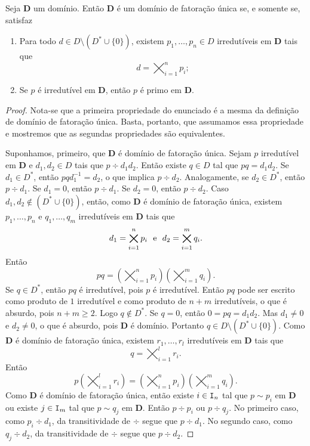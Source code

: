 \begin{teo}
	Seja $\bm D$ um domínio. Então $\bm D$ é um domínio de fatoração única se, e somente se, satisfaz
	\begin{enumerate}
	\item Para todo $d \in D \setminus (D^* \cup \{0\})$, existem $p_1, \ldots, p_n \in D$ irredutíveis em $\bm D$ tais que
	\begin{equation*}
	d = \bigtimes_{i=1}^n p_i;
	\end{equation*}
	\item Se $p$ é irredutível em $\bm D$, então $p$ é primo em $\bm D$.
	\end{enumerate}
\end{teo}
\begin{proof}
	Nota-se que a primeira propriedade do enunciado é a mesma da definição de domínio de fatoração única. Basta, portanto, que assumamos essa propriedade e mostremos que as segundas propriedades são equivalentes.

	Suponhamos, primeiro, que $\bm D$ é domínio de fatoração única. Sejam $p$ irredutível em $\bm D$ e $d_1,d_2 \in D$ tais que $p \div d_1d_2$. Então existe $q \in D$ tal que $pq=d_1d_2$. Se $d_1 \in D^*$, então $pqd_1^{-1}=d_2$, o que implica $p \div d_2$. Analogamente, se $d_2 \in D^*$, então $p \div d_1$. Se $d_1 = 0$, então $p \div d_1$. Se $d_2 = 0$, então $p \div d_2$. Caso $d_1,d_2 \notin (D^* \cup \{0\})$, então, como $\bm D$ é domínio de fatoração única, existem $p_1,\ldots,p_n$ e $q_1,\ldots,q_m$ irredutíveis em $\bm D$ tais que
	\begin{equation*}
	d_1 = \bigtimes_{i=1}^n p_i \text{\ \ e\ \ } d_2 = \bigtimes_{i=1}^m q_i.
	\end{equation*}
Então
	\begin{equation*}
	pq = \left(\bigtimes_{i=1}^n p_i\right) \left(\bigtimes_{i=1}^m q_i\right).
	\end{equation*}
 	Se $q \in D^*$, então $pq$ é irredutível, pois $p$ é irredutível. Então $pq$ pode ser escrito como produto de $1$ irredutível e como produto de $n+m$ irredutíveis, o que é absurdo, pois $n+m \geq 2$. Logo $q \notin D^*$. Se $q = 0$, então $0=pq=d_1d_2$. Mas $d_1 \neq 0$ e $d_2 \neq 0$, o que é absurdo, pois $\bm D$ é domínio. Portanto $q \in D \setminus (D^* \cup \{0\})$. Como $\bm D$ é domínio de fatoração única, existem $r_1,\ldots,r_l$ irredutíveis em $\bm D$ tais que
	\begin{equation*}
	q = \bigtimes_{i=1}^l r_i.
	\end{equation*}
Então
	\begin{equation*}
	p \left(\bigtimes_{i=1}^l r_i \right) = \left(\bigtimes_{i=1}^n p_i\right) \left(\bigtimes_{i=1}^m q_i\right).
	\end{equation*}
	Como $\bm D$ é domínio de fatoração única, então existe $i \in \mathtt I_n$ tal que $p \sim p_i$ em $\bm D$ ou existe $j \in \mathtt I_m$ tal que $p \sim q_j$ em $\bm D$. Então $p \div p_i$ ou $p \div q_j$. No primeiro caso, como $p_i \div d_1$, da transitividade de $\div$ segue que $p \div d_1$. No segundo caso, como $q_j \div d_2$, da transitividade de $\div$ segue que $p \div d_2$.


\end{proof}
